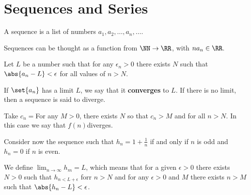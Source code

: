 \documentclass[11pt]{scrartcl}
\begin{document}
\section{Sequences and Series}

\begin{definition}
A sequence is a list of numbers $a_1, a_2, \dots ,a_n, \dots$.
\end{definition}

Sequences can be thought as a function from $\NN\to \RR$, with $na_n\in \RR$.

\begin{definition}
  Let $L$ be a number such that for any $\epsilon_{n} > 0$ there
  exists $N$ such that $\abs{a_n-L} < \epsilon$ for all values of $n>N$.

  If $\set{a_n}$ has a limit $L$, we say that it \textbf{converges} to $L$. If there is no limit, then a sequence is said to diverge.

  Take $c_n=$For any $M>0$, there exists $N$ so that $c_n >M$ and for all $n> N$. In this case we say that $f(n)$diverges.

  Consider now the sequence such that $h_n=1+ \frac{1}{n}$ if and only if $n$ is odd and $h_n=0$ if $n$ is even.

  We define $\lim_{n\to \infty}h_m = L$, which means that for a given $\epsilon > 0$ there exists $N >0 $ such that $h_{n < L+\epsilon}$ forr $n> N$ and for any $\epsilon >0$ and $M$ there exists $n >M$ such that $\abs{h_n - L}< \epsilon$.
\end{definition}
\end{document}
